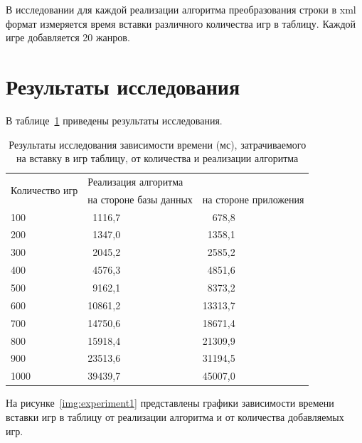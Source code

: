 В исследовании для каждой реализации алгоритма преобразования строки в xml формат измеряется время вставки различного количества игр в таблицу. Каждой игре добавляется 20 жанров.

\section{Результаты исследования}

В таблице~\ref{tbl:experiment1} приведены результаты исследования. 

\begin{table}[H]
	\centering
	\captionsetup{justification=raggedleft, singlelinecheck=false}
	\caption{Результаты исследования зависимости времени (мс), затрачиваемого на вставку в игр таблицу, от количества и реализации алгоритма}
	\label{tbl:experiment1}
	\begin{tabular}{|l|l|l|} 
		\hline
		\multirow{2}{*}{Количество игр} & \multicolumn{2}{l|}{Реализация алгоритма}\\\cline{2-3}
		&на стороне базы данных& на стороне приложения\\\hline
		100	&~1116,7&	~~678,8\\\hline
		200	&~1347,0&	~1358,1\\\hline
		300	&~2045,2&	~2585,2\\\hline
		400	&~4576,3&	~4851,6\\\hline
		500	&~9162,1&	~8373,2\\\hline
		600	&10861,2&	13313,7\\\hline
		700	&14750,6&	18671,4\\\hline
		800	&15918,4&	21309,9\\\hline
		900	&23513,6&	31194,5\\\hline
		1000	&39439,7&	45007,0\\\hline
		
	\end{tabular}
\end{table}

На рисунке~\ref{img:experiment1} представлены графики зависимости времени вставки игр в таблицу от реализации алгоритма и от количества добавляемых игр.

